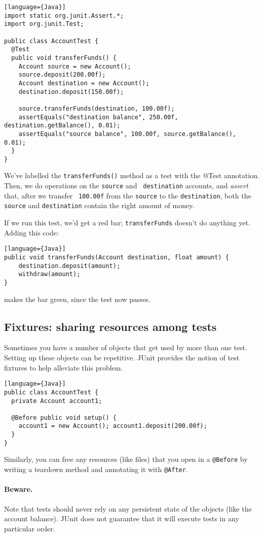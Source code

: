 \begin{verbatim}[language={Java}]
import static org.junit.Assert.*;
import org.junit.Test;

public class AccountTest {
  @Test
  public void transferFunds() {
    Account source = new Account();
    source.deposit(200.00f);
    Account destination = new Account();
    destination.deposit(150.00f);

    source.transferFunds(destination, 100.00f);
    assertEquals("destination balance", 250.00f, destination.getBalance(), 0.01);
    assertEquals("source balance", 100.00f, source.getBalance(), 0.01);
  }
}
\end{verbatim}
We've labelled the {\tt transferFunds()} method as a test with the
@Test annotation. Then, we do operations on the {\tt source} and {\tt
  destination} accounts, and {\em assert} that, after we transfer {\tt
  100.00f} from the {\tt source} to the {\tt destination}, both the
{\tt source} and {\tt destination} contain the right amount of money.

If we run this test, we'd get a red bar; {\tt transferFunds} doesn't
do anything yet. Adding this code:

\begin{verbatim}[language={Java}]
public void transferFunds(Account destination, float amount) {
    destination.deposit(amount);
    withdraw(amount);
}
\end{verbatim}
makes the bar green, since the test now passes.


\subsection*{Fixtures: sharing resources among tests}
Sometimes you have a number of objects that get used by more than
one test. Setting up these objects can be repetitive. JUnit provides
the notion of test fixtures to help alleviate this problem.

\begin{verbatim}[language={Java}]
public class AccountTest {
  private Account account1;

  @Before public void setup() {
    account1 = new Account(); account1.deposit(200.00f);
  }
}
\end{verbatim}

Similarly, you can free any resources (like files) that you open 
in a {\tt @Before} by writing a teardown method and annotating it
with {\tt @After}.

\paragraph{Beware.} Note that tests should never rely on any
persistent state of the objects (like the account balance).  JUnit
does not guarantee that it will execute tests in any particular order.

